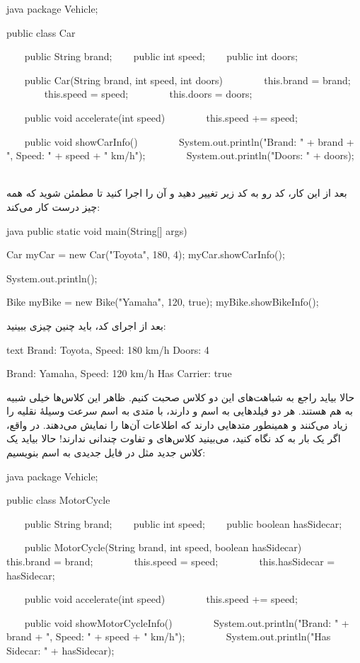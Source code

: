 \begin{codebox}{java}
package Vehicle;

public class Car {
    public String brand;
    public int speed;
    public int doors;

    public Car(String brand, int speed, int doors) {
        this.brand = brand;
        this.speed = speed;
        this.doors = doors;  
    }

    public void accelerate(int speed) {
        this.speed += speed;  
    }

    public void showCarInfo() {  
        System.out.println("Brand: " + brand + ", Speed: " + speed + " km/h");  
        System.out.println("Doors: " + doors);  
    }  
}
\end{codebox}

بعد از این کار، کد  رو به کد زیر تغییر دهید و آن را
اجرا کنید تا مطمئن شوید که همه چیز درست کار می‌کند:

\begin{codebox}{java}
public static void main(String[] args) {
    Car myCar = new Car("Toyota", 180, 4);
    myCar.showCarInfo();

    System.out.println();

    Bike myBike = new Bike("Yamaha", 120, true);
    myBike.showBikeInfo();
}

\end{codebox}

بعد از اجرای کد، باید چنین چیزی ببینید:

\begin{codebox}{text}
Brand: Toyota, Speed: 180 km/h  
Doors: 4  
  
Brand: Yamaha, Speed: 120 km/h  
Has Carrier: true
\end{codebox}

حالا بیاید راجع به شباهت‌های این دو کلاس صحبت کنیم. ظاهر این کلاس‌ها خیلی
شبیه به هم‌ هستند. هر دو فیلدهایی به اسم  و
 دارند، با متدی به اسم  سرعت
وسیلهٔ نقلیه را زیاد می‌کنند و همینطور متدهایی دارند که اطلاعات آن‌ها را
نمایش می‌دهند. در واقع، اگر یک بار به کد نگاه کنید، می‌بینید کلاس‌های
 و  تفاوت چندانی ندارند! حالا بیاید
یک کلاس جدید مثل  در فایل جدیدی به اسم
 بنویسیم:

\begin{codebox}{java}
package Vehicle;

public class MotorCycle {
    public String brand;
    public int speed;
    public boolean hasSidecar;

    public MotorCycle(String brand, int speed, boolean hasSidecar) {
        this.brand = brand;
        this.speed = speed;
        this.hasSidecar = hasSidecar;  
    }

    public void accelerate(int speed) {
        this.speed += speed;  
    }

    public void showMotorCycleInfo() {  
        System.out.println("Brand: " + brand + ", Speed: " + speed + " km/h");  
        System.out.println("Has Sidecar: " + hasSidecar);  
    }  
}
\end{codebox}

